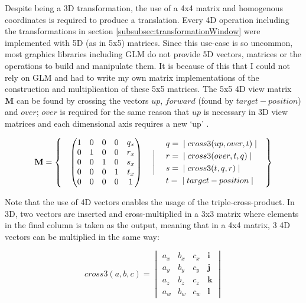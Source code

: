 \documentclass[11pt, a4paper]{article}
\begin{document}
Despite being a 3D transformation, the use of a 4x4 matrix and homogenous coordinates is required to produce a translation. Every 4D operation including the transformations in section \ref{subsubsec:transformationWindow} were implemented with 5D (as in 5x5) matrices. Since this use-case is so uncommon, most graphics libraries including GLM do not provide 5D vectors, matrices or the operations to build and manipulate them. It is because of this that I could not rely on GLM and had to write my own matrix implementations of the construction and multiplication of these 5x5 matrices. The 5x5 4D view matrix $\textbf{M}$ can be found by crossing the vectors $up$, $forward$ (found by $target - position$) and $over$; $over$ is required for the same reason that $up$ is necessary in 3D view matrices and each dimensional axis requires a new `up' \parencite[\texttt{CameraND.h}]{truengine}.

\begin{equation*}
  \textbf{M} =
  \left\{\quad
  \begin{pmatrix}
  1 & 0 & 0 & 0 & q_x \\
  0 & 1 & 0 & 0 & r_x \\
  0 & 0 & 1 & 0 & s_x \\
  0 & 0 & 0 & 1 & t_x \\
  0 & 0 & 0 & 0 & 1
  \end{pmatrix}
  \quad \Biggm{|} \quad
  \begin{aligned}
    & q = \;|\; cross3(up, over, t) \;| \\
    & r = \;|\; cross3(over, t, q) \;| \\
    & s = \;|\; cross3(t, q, r) \;| \\
    & t = \;|\; target - position \;|
  \end{aligned}
  \quad\right\}
\end{equation*}

Note that the use of 4D vectors enables the usage of the triple-cross-product. In 3D, two vectors are inserted and cross-multiplied in a 3x3 matrix where elements in the final column is taken as the output, meaning that in a 4x4 matrix, 3 4D vectors can be multiplied in the same way:

\begin{equation*}
  cross3(a, b, c) =
  \begin{vmatrix}
  a_x & b_x & c_x & \textbf{i} \\
  a_y & b_y & c_y & \textbf{j} \\
  a_z & b_z & c_z & \textbf{k} \\
  a_w & b_w & c_w & \textbf{l}
  \end{vmatrix}
\end{equation*}
\end{document}

